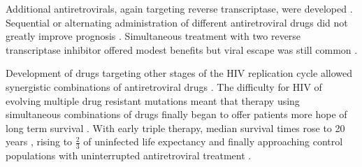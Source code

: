 \documentclass[../sherrill-Mix_thesis.tex]{subfiles}
\begin{document}
	Additional antiretrovirals, again targeting reverse transcriptase, were developed \citep{Vella2012}. Sequential or alternating administration of different antiretroviral drugs did not greatly improve prognosis \citep{Kahn1992,Skowron1993,Abrams1994,deJong1994,Schmit1996a}. Simultaneous treatment with two reverse transcriptase inhibitor offered modest benefits but viral escape was still common \citep{Collier1993,Hammer1996,Eron1995,Saravolatz1996,Darbyshire1996}.

	Development of drugs targeting other stages of the HIV replication cycle allowed synergistic combinations of antiretroviral drugs \citep{Dornsife1991,Johnson1991,Cox1994,Feng2009,Jilek2012,Kulkarni2014}. The difficulty for HIV of evolving multiple drug resistant mutations \citep{Chow1993,Larder1995} meant that therapy using simultaneous combinations of drugs finally began to offer patients more hope of long term survival \citep{Collier1996,Hammer1997,Gulick1997,Montaner1998,Moore1999}. With early triple therapy, median survival times rose to 20 years \citep{AntiretroviralTherapyCohortCollaboration2009,Harrison2010}, rising to $\frac{2}{3}$ of uninfected life expectancy \citep{ATCC2008,Keiser2004} and finally approaching control populations with uninterrupted antiretroviral treatment \citep{vanSighem2010,Nakagawa2013,Johnson2013}. %


	 

\end{document}
